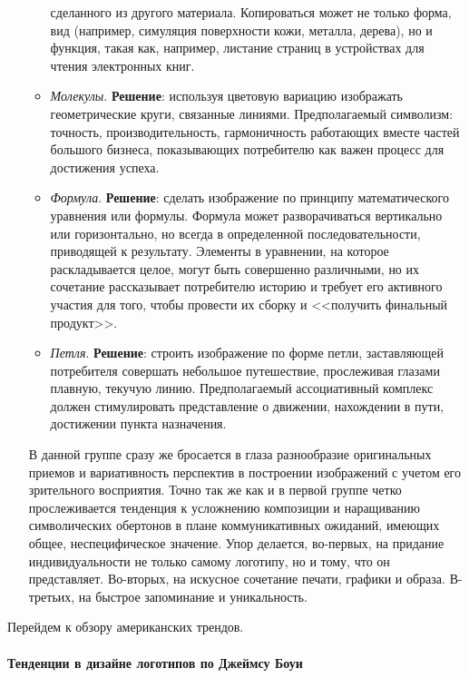 \begin{enumerate}[label=\asbuk*)]
\begin{itemize}
    сделанного  из другого материала. Копироваться может не только форма, вид (например, симуляция
    поверхности кожи, металла, дерева), но и функция, такая как, например, листание страниц в
    устройствах для чтения электронных книг.
  \item \emph{Молекулы}. \textbf{Решение}: используя цветовую вариацию изображать геометрические
    круги, связанные линиями. Предполагаемый символизм: точность, производительность, гармоничность
    работающих вместе частей большого бизнеса, показывающих потребителю как важен процесс для
    достижения успеха.
  \item \emph{Формула}. \textbf{Решение}: сделать изображение по принципу математического уравнения
    или формулы. Формула может разворачиваться вертикально или горизонтально, но всегда в
    определенной последовательности, приводящей к результату. Элементы в уравнении, на которое
    раскладывается целое, могут быть совершенно различными, но их сочетание рассказывает потребителю
    историю и требует его активного участия для того, чтобы провести их сборку и <<получить финальный
    продукт>>.
  \item \emph{Петля}. \textbf{Решение}: строить изображение по форме петли, заставляющей потребителя
    совершать небольшое путешествие, прослеживая глазами плавную, текучую линию. Предполагаемый
    ассоциативный комплекс должен стимулировать представление о движении, нахождении в пути,
    достижении пункта назначения.
  \end{itemize}

  В данной группе сразу же бросается в глаза разнообразие оригинальных приемов и вариативность
  перспектив в построении изображений с учетом его зрительного восприятия. Точно так же как и в первой
  группе четко прослеживается тенденция к усложнению композиции и наращиванию символических обертонов
  в плане коммуникативных ожиданий, имеющих общее, неспецифическое значение. Упор делается, во-первых,
  на придание индивидуальности не только самому логотипу, но и тому, что он представляет. Во-вторых,
  на искусное сочетание печати, графики и образа. В-третьих, на быстрое запоминание и уникальность.
\end{enumerate}

Перейдем к обзору американских трендов.

\paragraph{Тенденции в дизайне логотипов по Джеймсу Боуи}

